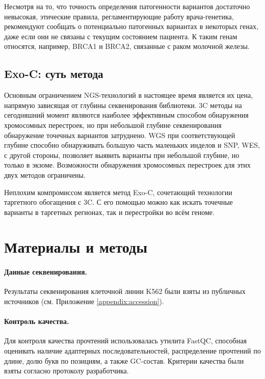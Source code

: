 \documentclass[a4paper,12pt]{article}
\begin{document}
Несмотря на то, что точность определения патогенности вариантов достаточно невысокая, этические правила, регламентирующие работу врача-генетика, рекомендуют сообщать о потенциально патогенных вариантах в некоторых генах, даже если они не связаны с текущим состоянием пациента.
К таким генам относятся, например, BRCA1 и BRCA2, связанные с раком молочной железы.

\subsection{Exo-C: суть метода}

Основным ограничением NGS-технологий в настоящее время является их цена, напрямую зависящая от глубины секвенирования библиотеки.
3C методы на сегодняшний момент являются наиболее эффективным способом обнаружения хромосомных перестроек, но при небольшой глубине секвенирования обнаружение точечных вариантов затруднено.
WGS при соответствующей глубине способно обнаруживать большую часть маленьких инделов и SNP, WES, с другой стороны, позволяет выявить варианты при небольшой глубине, но только в экзоме.
Возможности обнаружения хромосомных перестроек для этих двух методов ограничены.

Неплохим компромиссом является метод Exo-C, сочетающий технологии таргетного обогащения с 3C.
С его помощью можно как искать точечные варианты в таргетных регионах, так и перестройки во всём геноме\cite{mozheiko}.

\section{Материалы и методы}

\paragraph{Данные секвенирования.}
Результаты секвенирования клеточной линии K562 были взяты из публичных источников (см. Приложение \ref{appendix:accession}).

\paragraph{Контроль качества.}
Для контроля качества прочтений использовалась утилита FastQC\cite{fastqc}, способная оценивать наличие адаптерных последовательностей, распределение прочтений по длине, долю букв по позициям, а также GC-состав.
Критерии качества были взяты согласно протоколу разработчика.
\end{document}
